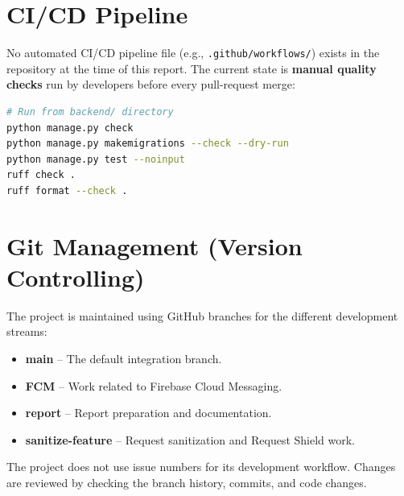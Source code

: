 \section{CI/CD Pipeline}

No automated CI/CD pipeline file (e.g., \texttt{.github/workflows/}) exists
in the repository at the time of this report.  The current state is
\textbf{manual quality checks} run by developers before every pull-request merge:

\begin{lstlisting}[language=bash,caption={Manual quality check commands
(backend/.../quality\_checks.sh)},label={lst:ci}]
# Run from backend/ directory
python manage.py check
python manage.py makemigrations --check --dry-run
python manage.py test --noinput
ruff check .
ruff format --check .
\end{lstlisting}

\section{Git Management (Version Controlling)}

The project is maintained using GitHub branches for the different development
streams:

\begin{itemize}
  \item \textbf{main} -- The default integration branch.
  \item \textbf{FCM} -- Work related to Firebase Cloud Messaging.
  \item \textbf{report} -- Report preparation and documentation.
  \item \textbf{sanitize-feature} -- Request sanitization and Request Shield work.
\end{itemize}

The project does not use issue numbers for its development workflow. Changes
are reviewed by checking the branch history, commits, and code changes.

